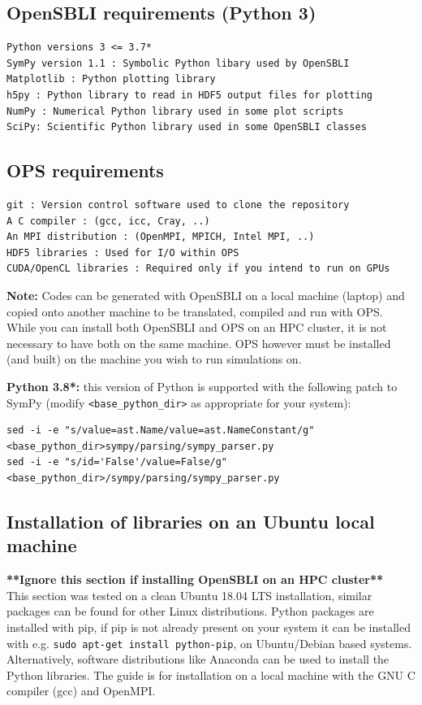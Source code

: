 \documentclass[11pt]{article}
\begin{document}
\subsection*{OpenSBLI requirements (Python 3)}
\begin{verbatim}
Python versions 3 <= 3.7*
SymPy version 1.1 : Symbolic Python libary used by OpenSBLI
Matplotlib : Python plotting library
h5py : Python library to read in HDF5 output files for plotting
NumPy : Numerical Python library used in some plot scripts
SciPy: Scientific Python library used in some OpenSBLI classes
\end{verbatim}
\subsection*{OPS requirements}
\begin{verbatim}
git : Version control software used to clone the repository
A C compiler : (gcc, icc, Cray, ..)
An MPI distribution : (OpenMPI, MPICH, Intel MPI, ..)
HDF5 libraries : Used for I/O within OPS
CUDA/OpenCL libraries : Required only if you intend to run on GPUs
\end{verbatim}
\textbf{Note:} Codes can be generated with OpenSBLI on a local machine (laptop) and copied onto another machine to be translated, compiled and run with OPS. While you can install both OpenSBLI and OPS on an HPC cluster, it is not necessary to have both on the same machine. OPS however must be installed (and built) on the machine you wish to run simulations on.


\noindent \textbf{Python 3.8*:} this version of Python is supported with the following patch to SymPy (modify \verb|<base_python_dir>| as appropriate for your system):

\begin{lstlisting}
sed -i -e "s/value=ast.Name/value=ast.NameConstant/g" <base_python_dir>sympy/parsing/sympy_parser.py
sed -i -e "s/id='False'/value=False/g" <base_python_dir>/sympy/parsing/sympy_parser.py
\end{lstlisting}

\subsection{Installation of libraries on an Ubuntu local machine}
\textbf{**Ignore this section if installing OpenSBLI on an HPC cluster**}\\
This section was tested on a clean Ubuntu 18.04 LTS installation, similar packages can be found for other Linux distributions. Python packages are installed with pip, if pip is not already present on your system it can be installed with e.g. \verb|sudo apt-get install python-pip|, on Ubuntu/Debian based systems. Alternatively, software distributions like Anaconda can be used to install the Python libraries. The guide is for installation on a local machine with the GNU C compiler (gcc) and OpenMPI.
\end{document}
